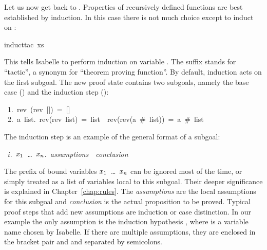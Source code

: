 \begin{isabellebody}
\begin{isamarkuptxt}
Let us now get back to . Properties of recursively
defined functions are best established by induction. In this case there is
not much choice except to induct on :%
\end{isamarkuptxt}%
induct{\isacharunderscore}tac\ xs{\isacharparenright}%
\begin{isamarkuptxt}%
\noindent{}%
This tells Isabelle to perform induction on variable . The suffix
 stands for ``tactic'', a synonym for ``theorem proving function''.
By default, induction acts on the first subgoal. The new proof state contains
two subgoals, namely the base case () and the induction step
():
\begin{isabelle}
~1.~rev~(rev~[])~=~[]\isanewline
~2.~{\isasymAnd}a~list.~rev(rev~list)~=~list~{\isasymLongrightarrow}~rev(rev(a~\#~list))~=~a~\#~list
\end{isabelle}

The induction step is an example of the general format of a subgoal:
\begin{isabelle}
~$i$.~{\isasymAnd}$x\sb{1}$~\dots~$x\sb{n}$.~{\it assumptions}~{\isasymLongrightarrow}~{\it conclusion}
\end{isabelle}
The prefix of bound variables \isasymAnd$x\sb{1}$~\dots~$x\sb{n}$ can be
ignored most of the time, or simply treated as a list of variables local to
this subgoal. Their deeper significance is explained in Chapter~\ref{chap:rules}.
The {\it assumptions} are the local assumptions for this subgoal and {\it
  conclusion} is the actual proposition to be proved. Typical proof steps
that add new assumptions are induction or case distinction. In our example
the only assumption is the induction hypothesis , where  is a variable name chosen by Isabelle. If there
are multiple assumptions, they are enclosed in the bracket pair
 and
 and separated by semicolons.


\end{isamarkuptxt}
\end{isabellebody}
